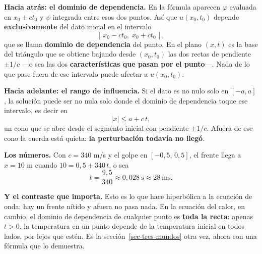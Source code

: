 \documentclass[
  spanish,
  a4paper,
]{scrbook}
\theoremstyle{definition}
\theoremstyle{plain}
\theoremstyle{definition}
\theoremstyle{plain}
\theoremstyle{definition}
\theoremstyle{remark}
\begin{document}
\begin{tcolorbox}[enhanced jigsaw, arc=.35mm, bottomrule=.15mm, bottomtitle=1mm, breakable, colback=white, colbacktitle=quarto-callout-tip-color!10!white, colframe=quarto-callout-tip-color-frame, coltitle=black, left=2mm, leftrule=.75mm, opacityback=0, opacitybacktitle=0.6, rightrule=.15mm, title=\textcolor{quarto-callout-tip-color}{\faLightbulb}\hspace{0.5em}{Solución}, titlerule=0mm, toprule=.15mm, toptitle=1mm]

\textbf{Hacia atrás: el dominio de dependencia.} En la fórmula aparecen
\(\varphi\) evaluada en \(x_0\pm ct_0\) y \(\psi\) integrada entre esos
dos puntos. Así que \(u(x_0,t_0)\) depende \textbf{exclusivamente} del
dato inicial en el intervalo \[[\,x_0 - ct_0,\; x_0 + ct_0\,],\] que se
llama \textbf{dominio de dependencia} del punto. En el plano \((x,t)\)
es la base del triángulo que se obtiene bajando desde \((x_0,t_0)\) las
dos rectas de pendiente \(\pm 1/c\) ---o sea las dos
\textbf{características que pasan por el punto}---. Nada de lo que pase
fuera de ese intervalo puede afectar a \(u(x_0,t_0)\).

\textbf{Hacia adelante: el rango de influencia.} Si el dato es no nulo
solo en \([-a,a]\), la solución puede ser no nula solo donde el dominio
de dependencia toque ese intervalo, es decir en \[|x| \le a + c\,t ,\]
un cono que se abre desde el segmento inicial con pendiente \(\pm 1/c\).
Afuera de ese cono la cuerda está quieta: \textbf{la perturbación
todavía no llegó}.

\textbf{Los números.} Con \(c=340\) m/s y el golpe en
\([-0{,}5,\,0{,}5]\), el frente llega a \(x=10\) m cuando
\(10 = 0{,}5 + 340\,t\), o sea
\[t = \frac{9{,}5}{340} \approx 0{,}028\ \text{s} \approx 28\ \text{ms}.\]

\textbf{Y el contraste que importa.} Esto es lo que hace hiperbólica a
la ecuación de onda: hay un frente nítido y afuera no pasa nada. En la
ecuación del calor, en cambio, el dominio de dependencia de cualquier
punto es \textbf{toda la recta}: apenas \(t>0\), la temperatura en un
punto depende de la temperatura inicial en todos lados, por lejos que
estén. Es la sección~\ref{sec-tres-mundos} otra vez, ahora con una
fórmula que lo demuestra.

\end{tcolorbox}
\end{document}
